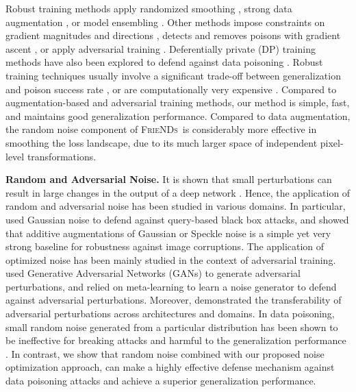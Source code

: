 \documentclass{article}
\newcommand{\alg}{\textsc{FrieNDs}}
\begin{document}
Robust training methods %
apply randomized smoothing \citep{weber2020rab}, strong data augmentation \citep{borgnia2021strong}, or model ensembling \citep{levine2020deep}. Other methods impose constraints on gradient magnitudes and directions \cite{hong2020effectiveness}, detects and removes poisons with gradient ascent \citep{li2021anti}, or apply adversarial training \citep{geiping2021doesn,madry2018towards,tao2021better}. Deferentially private (DP) training methods have also been explored to defend against data poisoning \citep{abadi2016deep,borgnia2021dp,jayaraman2019evaluating}. Robust training techniques usually involve a significant trade-off between generalization and poison success rate \citep{abadi2016deep,hong2020effectiveness,li2021anti,madry2018towards,tao2021better}, or are computationally very expensive \citep{geiping2021doesn,madry2018towards}. Compared to augmentation-based and adversarial training methods, our method is simple, fast, and maintains good generalization performance. 
Compared to data augmentation, the random noise component of \alg~is considerably more effective in smoothing the loss landscape, due to its much larger space of independent pixel-level transformations.



\textbf{{Random and Adversarial Noise}.}
It is shown that small perturbations can result in large changes in the output of a deep network \cite{szegedy2013intriguing}.
Hence, the application of random and adversarial noise has been studied in various domains. 
In particular, \cite{qin2021random} used Gaussian noise to defend against query-based black box attacks, and 
\cite{rusak2020simple} showed that additive augmentations of Gaussian or Speckle noise is a simple yet very strong baseline for robustness against image corruptions. 
The application of optimized noise has been mainly studied in the context of adversarial training.  
\cite{cai2021learning} used Generative Adversarial Networks (GANs) to generate adversarial perturbations, and \cite{madaan2021learning} relied on meta-learning to learn a noise generator to defend against adversarial perturbations. %
Moreover, \cite{naseer2019cross,xie2019improving} demonstrated the transferability of adversarial perturbations across architectures and domains.
In data poisoning, small random noise generated from a particular distribution has been shown to be ineffective for breaking attacks and harmful to the generalization performance \cite{geiping2021doesn}. %
In contrast, we show that random noise %
combined with our proposed noise optimization approach, 
can make a highly effective defense mechanism against data poisoning attacks and achieve a superior generalization performance. 
\end{document}
